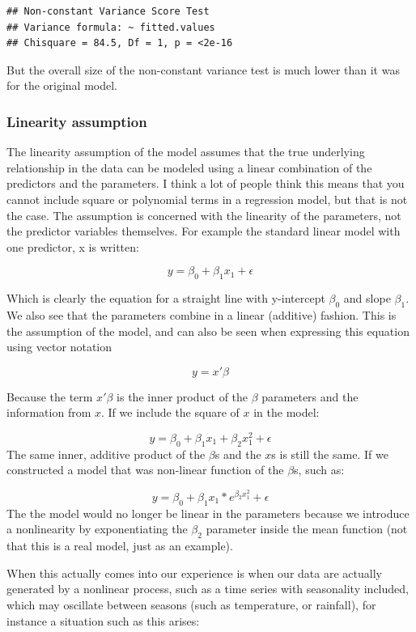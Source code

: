 \documentclass[
]{article}
\begin{document}
\begin{verbatim}
## Non-constant Variance Score Test 
## Variance formula: ~ fitted.values 
## Chisquare = 84.5, Df = 1, p = <2e-16
\end{verbatim}

But the overall size of the non-constant variance test is much lower than it was for the original model.

\hypertarget{linearity-assumption}{%
\subsubsection{Linearity assumption}\label{linearity-assumption}}

The linearity assumption of the model assumes that the true underlying relationship in the data can be modeled using a linear combination of the predictors and the parameters. I think a lot of people think this means that you cannot include square or polynomial terms in a regression model, but that is not the case. The assumption is concerned with the linearity of the parameters, not the predictor variables themselves. For example the standard linear model with one predictor, x is written:

\[y = \beta_0 + \beta_1 x_1 + \epsilon\]

Which is clearly the equation for a straight line with y-intercept \(\beta_0\) and slope \(\beta_1\). We also see that the parameters combine in a linear (additive) fashion. This is the assumption of the model, and can also be seen when expressing this equation using vector notation

\[y = x' \beta\]

Because the term \(x' \beta\) is the inner product of the \(\beta\) parameters and the information from \(x\). If we include the square of \(x\) in the model:

\[y = \beta_0 + \beta_1 x_1 + \beta_2 x_1^2 + \epsilon\]
The same inner, additive product of the \(\beta\)s and the \(x\)s is still the same. If we constructed a model that was non-linear function of the \(\beta\)s, such as:

\[y = \beta_0 + \beta_1 x_1 *  e^{\beta_2 x_1^2} + \epsilon\]
The the model would no longer be linear in the parameters because we introduce a nonlinearity by exponentiating the \(\beta_2\) parameter inside the mean function (not that this is a real model, just as an example).

When this actually comes into our experience is when our data are actually generated by a nonlinear process, such as a time series with seasonality included, which may oscillate between seasons (such as temperature, or rainfall), for instance a situation such as this arises:
\end{document}
